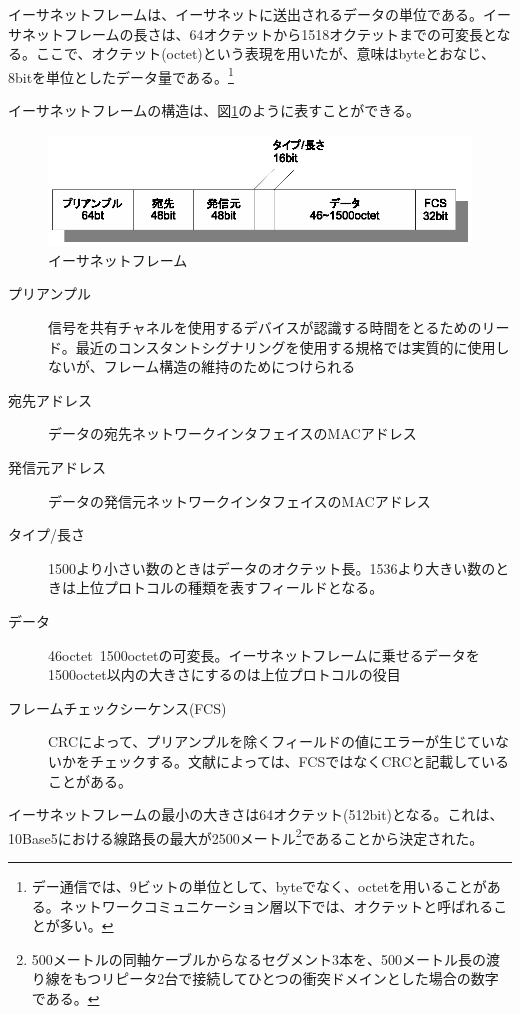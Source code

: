 イーサネットフレームは、イーサネットに送出されるデータの単位である。イーサネットフレームの長さは、64オクテットから1518オクテットまでの可変長となる。ここで、オクテット(octet)という表現を用いたが、意味はbyteとおなじ、8bitを単位としたデータ量である。\footnote{デー通信では、9ビットの単位として、byteでなく、octetを用いることがある。ネットワークコミュニケーション層以下では、オクテットと呼ばれることが多い。}

イーサネットフレームの構造は、図\ref{fig:etherframe}のように表すことができる。

\begin{figure}[htbp]
	\includegraphics[width=14cm,clip]{draw/ethernetframe.eps}
	\caption{イーサネットフレーム}
	\label{fig:etherframe}
\end{figure}


\begin{description}
\item[プリアンプル]信号を共有チャネルを使用するデバイスが認識する時間をとるためのリード。最近のコンスタントシグナリングを使用する規格では実質的に使用しないが、フレーム構造の維持のためにつけられる
\item[宛先アドレス]データの宛先ネットワークインタフェイスのMACアドレス
\item[発信元アドレス]データの発信元ネットワークインタフェイスのMACアドレス
\item[タイプ/長さ]1500より小さい数のときはデータのオクテット長。1536より大きい数のときは上位プロトコルの種類を表すフィールドとなる。
\item[データ]46octet~1500octetの可変長。イーサネットフレームに乗せるデータを1500octet以内の大きさにするのは上位プロトコルの役目
\item[フレームチェックシーケンス(FCS)]CRCによって、プリアンプルを除くフィールドの値にエラーが生じていないかをチェックする。文献によっては、FCSではなくCRCと記載していることがある。
\end{description}

イーサネットフレームの最小の大きさは64オクテット(512bit)となる。これは、10Base5における線路長の最大が2500メートル\footnote{500メートルの同軸ケーブルからなるセグメント3本を、500メートル長の渡り線をもつリピータ2台で接続してひとつの衝突ドメインとした場合の数字である。}であることから決定された。


